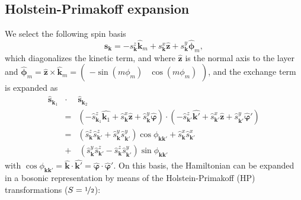 \documentclass[english,aps,prd,nofootinbib,twocolumn]{revtex4-1}
\begin{document}
\subsection{Holstein-Primakoff expansion}
\label{sect:Supp:Holstein-Primakoff}
We select the following spin basis 
\begin{equation}
\label{eq:Supp:Zeemann-basis}
\mathbf{s}_{\mathbf{k}} = -
s_{\mathbf{k}}^{z}\hat{\mathbf{k}}_{m} + 
s_{\mathbf{k}}^{x} \hat{\mathbf{z}} + 
s_{\mathbf{k}}^{y}\hat{\boldsymbol{\phi}}_{m},
\end{equation}
which diagonalizes the kinetic term, and where $\hat{\mathbf{z}}$ is the normal axis to the layer and $\hat{\boldsymbol{\phi}}_{m}=\hat{\mathbf{z}}\times \hat{\mathbf{k}}_{m} = 
\begin{pmatrix}
-\sin(m\phi_{m})	&	\!\!\cos(m\phi_{m})
\end{pmatrix}$, and the exchange term is expanded as
\begin{eqnarray}
\label{eq:Spin-dot-product-along-k}
\hat{\mathbf{s}}_{\mathbf{k}_{1}}\!\! &\cdot& \hat{\mathbf{s}}_{\mathbf{k}_{2}} 
\\ &=& \nonumber 
\left( -\hat{s}_{\mathbf{k}_{1}}^{z} \hat{\mathbf{k}_{1}} + \hat{s}_{\mathbf{k }}^{x} \hat{\mathbf{z }} + \hat{s}_{\mathbf{k }}^{y} \hat{\boldsymbol{\varphi}} \right) \cdot \left( -\hat{s}_{\mathbf{k'}}^{z} \hat{\mathbf{k'}} + \hat{s}_{\mathbf{k'}}^{x} \hat{\mathbf{z }} + \hat{s}_{\mathbf{k'}}^{y} \hat{\boldsymbol{\varphi}}'\right) 
\\ &=& \nonumber 
\left(
\hat{s}_{\mathbf{k }}^{z}\hat{s}_{\mathbf{k'}}^{z}+ \hat{s}_{\mathbf{k }}^{y}\hat{s}_{\mathbf{k'}}^{y} \right)\cos \phi_{\mathbf{k}\mathbf{k'}} + 
\hat{s}_{\mathbf{k }}^{x}\hat{s}_{\mathbf{k'}}^{x} 
\\ &+& \,
\left(
\hat{s}_{\mathbf{k }}^{y}\hat{s}_{\mathbf{k'}}^{z}- \hat{s}_{\mathbf{k }}^{z}\hat{s}_{\mathbf{k'}}^{y} \right)\sin \phi_{\mathbf{k}\mathbf{k'}}
\nonumber	
\end{eqnarray}
with $\cos \phi_{\mathbf{k}\mathbf{k'}} = \hat{\mathbf{k }}\cdot\hat{\mathbf{k'}} = \hat{\boldsymbol{\varphi}}\cdot\hat{\boldsymbol{\varphi}}'$. 
On this basis, the Hamiltonian can be expanded in a bosonic representation by means of the Holstein-Primakoff (HP) transformations ($S=\nicefrac{1}{2}$):
\end{document}
